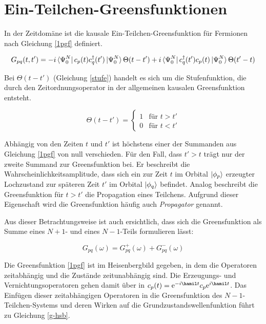 \section{Ein-Teilchen-Greensfunktionen}\label{greensfkt}

In der Zeitdomäne ist die kausale Ein-Teilchen-Greensfunktion für Fermionen nach Gleichung \ref{1pgf} definiert.

\begin{equation}\label{1pgf}
G_{pq}(t,t') = -i \bra{\Psi_0^N}c_p(t)c_q^\dagger(t')\ket{\Psi_0^N}\Theta(t-t') +i \bra{\Psi_0^N}c_q^\dagger(t')c_p(t)\ket{\Psi_0^N}\Theta(t'-t)
\end{equation}

Bei $\Theta(t-t')$ (Gleichung \ref{stufe}) handelt es sich um die Stufenfunktion, die durch den Zeitordnungsoperator in der allgemeinen kausalen Greensfunktion entsteht.

\begin{equation}\label{stufe}
\Theta(t-t') = \begin{cases}
1 & \text{für } t>t'\\
0 & \text{für } t<t'
\end{cases}
\end{equation}

Abhängig von den Zeiten $t$ und $t'$ ist höchstens einer der Summanden aus Gleichung \ref{1pgf} von null verschieden. Für den Fall, dass $t'>t$ trägt nur der zweite Summand zur Greensfunktion bei. Er beschreibt die Wahrscheinlichkeitsamplitude, dass sich ein zur Zeit $t$ im Orbital $\ket{\phi_p}$ erzeugter Lochzustand zur späteren Zeit $t'$ im Orbital $\ket{\phi_q}$ befindet. Analog beschreibt die Greensfunktion für $t>t'$ die Propagation eines Teilchens. Aufgrund dieser Eigenschaft wird die Greensfunktion häufig auch \emph{Propagator} genannt.\cite{nolting7}

Aus dieser Betrachtungsweise ist auch ersichtlich, dass sich die Greensfunktion als Summe eines $N+1$- und eines $N-1$-Teils formulieren lässt:

\begin{equation}
G_{pq}(\omega) = G_{pq}^+(\omega) + G_{pq}^-(\omega)
\end{equation}

Die Greensfunktion \ref{1pgf} ist im Heisenbergbild gegeben, in dem die Operatoren zeitabhängig und die Zustände zeitunabhängig sind. Die Erzeugungs- und Vernichtungsoperatoren gehen damit über in $c_p(t) = \mathrm{e}^{-i\hamil t} c_p \mathrm{e}^{i\hamil t}$. Das Einfügen dieser zeitabhängigen Operatoren in die Greensfunktion des $N-1$-Teilchen-Systems und deren Wirken auf die Grundzustandswellenfunktion führt zu Gleichung \ref{g-hsb}.

